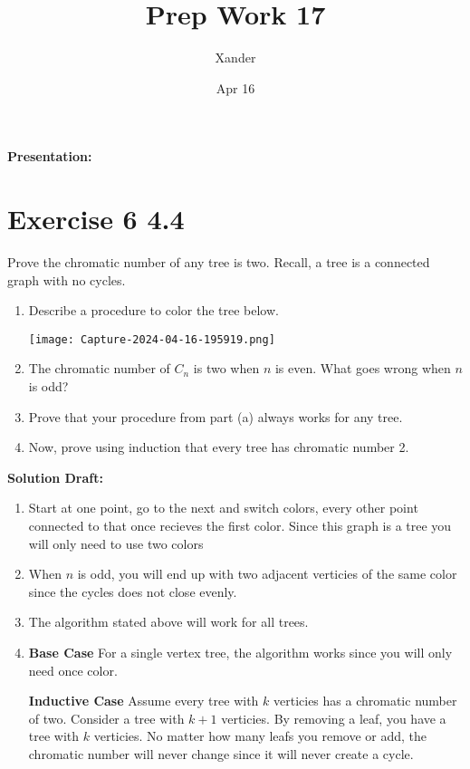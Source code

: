 \documentclass{article}
\title{Prep Work 17}
\author{Xander}
\date{Apr 16}
\begin{document}
\maketitle
\noindent\textbf{Presentation:} 


\section*{Exercise 6 4.4}  

Prove the chromatic number of any tree is two. Recall, a tree is a connected graph with no cycles.%

\begin{enumerate}[label= (\alph*)]
    \item Describe a procedure to color the tree below.
        \begin{center}
            \texttt{[image: Capture-2024-04-16-195919.png]} %
        \end{center}
    \item The chromatic number of \(C_n\) is two when \(n\) is even. What goes wrong when \(n\) is odd?
    \item Prove that your procedure from part (a) always works for any tree.
    \item Now, prove using induction that every tree has chromatic number 2.
\end{enumerate}
    

\vspace{0.5cm}
\noindent\textbf{Solution Draft:} 
\vspace{0.2cm}

\begin{enumerate}
    \item Start at one point, go to the next and switch colors, every other point connected to that once recieves the first color. Since this graph is a tree you will only need to use two colors
    \item When $n$ is odd, you will end up with two adjacent verticies of the same color since the cycles does not close evenly.
    \item The algorithm stated above will work for all trees.
    \item 

    \textbf{Base Case}
    For a single vertex tree, the algorithm works since you will only need once color.

    \textbf{Inductive Case}
    Assume every tree with $k$ verticies has a chromatic number of two. Consider a tree with $k+1$ verticies. By removing a leaf, you have a tree with $k$ verticies. No matter how many leafs you remove or add, the chromatic number will never change since it will never create a cycle.
\end{enumerate}
\end{document}

